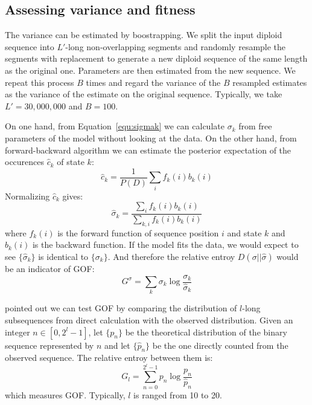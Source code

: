 \documentclass[pdftex,10pt]{article}
\begin{document}
\subsection{Assessing variance and fitness}

\begin{rem}[Bootstrapping]\label{rem:bootstrap}
  The variance can be estimated by boostrapping. We split the input
  diploid sequence into $L'$-long non-overlapping segments and randomly
  resample the segments with replacement to generate a new diploid
  sequence of the same length as the original one.  Parameters are then
  estimated from the new sequence. We repeat this process $B$ times and
  regard the variance of the $B$ resampled estimates as the variance of
  the estimate on the original sequence. Typically, we take
  $L'=30,000,000$ and $B=100$.
\end{rem}

\begin{rem}\label{rem:gof-pi}
  On one hand, from Equation~\ref{equ:sigmak} we can calculate
  $\sigma_k$ from free parameters of the model without looking at the
  data. On the other hand, from forward-backward algorithm we can
  estimate the posterior expectation of the occurences $\hat{c}_k$
  of state $k$:
  \begin{equation*}
    \hat{c}_k=\frac{1}{P(D)}\sum_if_k(i)b_k(i)
  \end{equation*}
  Normalizing $\hat{c}_k$ gives:
  \begin{equation*}
    \hat{\sigma}_k=\frac{\sum_if_k(i)b_k(i)}{\sum_{k,i}f_k(i)b_k(i)}
  \end{equation*}  
  where $f_k(i)$ is the forward function of sequence position $i$ and
  state $k$ and $b_k(i)$ is the backward function. If the model fits the
  data, we would expect to see $\{\hat{\sigma}_k\}$ is identical to
  $\{\sigma_k\}$. And therefore the relative entroy
  $D(\sigma||\hat{\sigma})$ would be an indicator of GOF:
  \begin{equation*}
    G^{\sigma}=\sum_k\sigma_k\log\frac{\sigma_k}{\hat{\sigma}_k}
  \end{equation*}
\end{rem}

\begin{rem}\label{rem:gof2}
  \citet{MacKay-Altman:2004lr} pointed out we can test GOF by comparing
  the distribution of $l$-long subsequences from direct calculation with
  the observed distribution. Given an integer $n\in[0,2^l-1]$, let
  $\{p_n\}$ be the theoretical distribution of the binary sequence
  represented by $n$ and let $\{\hat{p}_n\}$ be the one directly counted
  from the observed sequence. The relative entroy between them is:
  \begin{equation*}
    G_l=\sum_{n=0}^{2^l-1}p_n\log\frac{p_n}{\hat{p}_n}
  \end{equation*}
  which measures GOF. Typically, $l$ is ranged from 10 to 20.
\end{rem}
\end{document}
